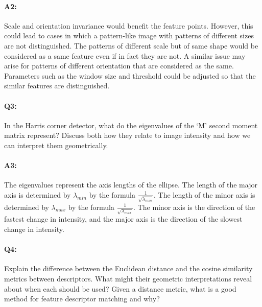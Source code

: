 \paragraph{A2:} Scale and orientation invariance would benefit the feature points. However, this could lead to cases in which a pattern-like image with patterns of different sizes are not distinguished. The patterns of different scale but of same shape would be considered as a same feature even if in fact they are not. A similar issue may arise for patterns of different orientation that are considered as the same. Parameters such as the window size and threshold could be adjusted so that the similar features are distinguished.




\pagebreak
\paragraph{Q3:} In the Harris corner detector, what do the eigenvalues of the `M' second moment matrix represent? Discuss both how they relate to image intensity and how we can interpret them geometrically.

\paragraph{A3:} The eigenvalues represent the axis lengths of the ellipse. The length of the major axis is determined by $\lambda_{min}$ by the formula $\frac{1}{\sqrt{\lambda_{min}}}$. The length of the minor axis is determined by $\lambda_{max}$ by the formula $\frac{1}{\sqrt{\lambda_{max}}}$. The minor axis is the direction of the fastest change in intensity, and the major axis is the direction of the slowest change in intensity.





\pagebreak
\paragraph{Q4:} Explain the difference between the Euclidean distance and the cosine similarity metrics between descriptors. What might their geometric interpretations reveal about when each should be used? Given a distance metric, what is a good method for feature descriptor matching and why?

